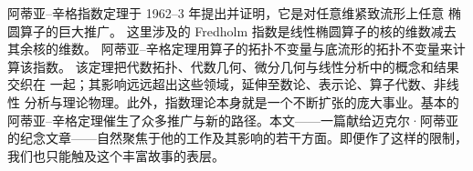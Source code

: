 \documentclass[11pt]{amsart}
\theoremstyle{definition}
\theoremstyle{remark}
\theoremstyle{plain}
\numberwithin{equation}{section}
\renewcommand{\:}{\colon}
\DeclareMathOperator{\coker}{coker}
\begin{document}
阿蒂亚–辛格指数定理于 1962–3 年提出并证明，它是对任意维紧致流形上任意
椭圆算子的巨大推广。
这里涉及的 Fredholm 指数是线性椭圆算子的核的维数减去其余核的维数。
阿蒂亚–辛格定理用算子的拓扑不变量与底流形的拓扑不变量来计算该指数。
该定理把代数拓扑、代数几何、微分几何与线性分析中的概念和结果交织在
一起；其影响远远超出这些领域，延伸至数论、表示论、算子代数、非线性
分析与理论物理。此外，指数理论本身就是一个不断扩张的庞大事业。基本的
阿蒂亚–辛格定理催生了众多推广与新的路径。本文——一篇献给迈克尔·阿蒂亚
的纪念文章——自然聚焦于他的工作及其影响的若干方面。即便作了这样的限制，
我们也只能触及这个丰富故事的表层。
\end{document}
